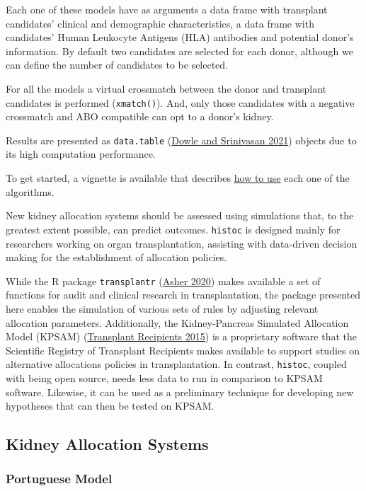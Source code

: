 \documentclass[
]{article}
\begin{document}
Each one of these models have as arguments a data frame with transplant
candidates' clinical and demographic characteristics, a data frame with
candidates' Human Leukocyte Antigens (HLA) antibodies and potential
donor's information. By default two candidates are selected for each
donor, although we can define the number of candidates to be selected.

For all the models a virtual crossmatch between the donor and transplant
candidates is performed (\texttt{xmatch()}). And, only those candidates
with a negative crossmatch and ABO compatible can opt to a donor's
kidney.

Results are presented as \texttt{data.table}
(\protect\hyperlink{ref-data.table}{Dowle and Srinivasan 2021}) objects
due to its high computation performance.

To get started, a vignette is available that describes
\href{https://txopen.github.io/histoc/articles/how_to.html}{how to use}
each one of the algorithms.

New kidney allocation systems should be assessed using simulations that,
to the greatest extent possible, can predict outcomes. \texttt{histoc}
is designed mainly for researchers working on organ transplantation,
assisting with data-driven decision making for the establishment of
allocation policies.

While the R package \texttt{transplantr}
(\protect\hyperlink{ref-transplantr}{Asher 2020}) makes available a set
of functions for audit and clinical research in transplantation, the
package presented here enables the simulation of various sets of rules
by adjusting relevant allocation parameters. Additionally, the
Kidney-Pancreas Simulated Allocation Model (KPSAM)
(\protect\hyperlink{ref-srtr}{Transplant Recipients 2015}) is a
proprietary software that the Scientific Registry of Transplant
Recipients makes available to support studies on alternative allocations
policies in transplantation. In contrast, \texttt{histoc}, coupled with
being open source, needs less data to run in comparison to KPSAM
software. Likewise, it can be used as a preliminary technique for
developing new hypotheses that can then be tested on KPSAM.

\hypertarget{kidney-allocation-systems}{%
\subsection{Kidney Allocation Systems}\label{kidney-allocation-systems}}

\hypertarget{portuguese-model}{%
\subsubsection{Portuguese Model}\label{portuguese-model}}
\end{document}
